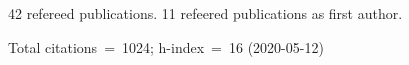 42 refereed publications. 11 refeered publications as first author.

Total citations~=~1024; h-index~=~16 (2020-05-12)
